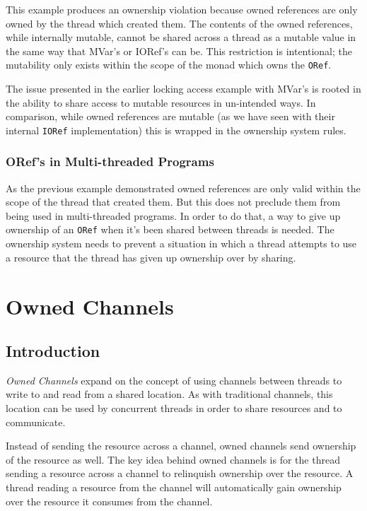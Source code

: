\documentclass[onehalf,11pt]{beavtex}
\begin{document}
This example %
produces an ownership violation because owned references are only owned by the
thread which created them.
The contents of the owned references, while internally mutable, cannot be shared
across a thread as a mutable value in the same way that MVar's or IORef's can be.
This restriction is intentional; the mutability only exists within the scope of
the monad which owns the \texttt{ORef}.

The issue presented in the earlier locking access example with MVar's is rooted
in the ability to share access to mutable resources in un-intended ways.
In comparison, while owned references are mutable (as we have seen
with their internal \texttt{IORef} implementation) this is wrapped in the
ownership system rules.

\subsection{ORef's in Multi-threaded Programs}

As the previous example demonstrated owned references are only valid within the
scope of the thread that created them.  But this does not preclude them from
being used in multi-threaded programs.
In order to do that, a way to give up ownership of an \texttt{ORef} when it's
been shared between threads is needed.
The ownership system needs to prevent a situation in which a thread attempts to
use a resource that the thread has given up ownership over by sharing. 


\chapter{Owned Channels}

\section{Introduction}

\textit{Owned Channels} expand on the concept of using channels between threads
to write to and read from a shared location.   As with traditional channels,
this location can be used by concurrent threads in order to share resources and
to communicate.

Instead of sending the resource across a channel, owned channels
send ownership of the resource as well.
The key idea behind owned channels is for the thread sending a
resource across a channel to relinquish ownership over the resource.
A thread reading a resource from the channel will automatically gain ownership
over the resource it consumes from the channel.
\end{document}
